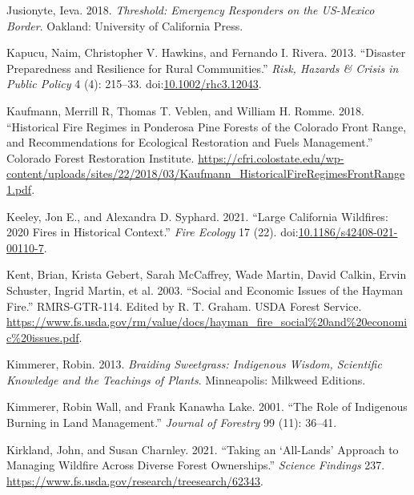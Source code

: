 \documentclass[
]{article}
\newlength{\cslhangindent}
\newenvironment{CSLReferences}[2] %
 {\begin{list}{}{%
  \setlength{\itemindent}{0pt}
  \setlength{\leftmargin}{0pt}
  \setlength{\parsep}{0pt}
  \ifodd #1
   \setlength{\leftmargin}{\cslhangindent}
   \setlength{\itemindent}{-1\cslhangindent}
  \fi
  \setlength{\itemsep}{#2\baselineskip}}}
 {\end{list}}
\begin{document}
\begin{CSLReferences}{1}{0}
Jusionyte, Ieva. 2018. \emph{Threshold: {Emergency Responders} on the {US-Mexico Border}}. Oakland: University of California Press.

Kapucu, Naim, Christopher V. Hawkins, and Fernando I. Rivera. 2013. {``Disaster {Preparedness} and {Resilience} for {Rural Communities}.''} \emph{Risk, Hazards \& Crisis in Public Policy} 4 (4): 215--33. doi:\href{https://doi.org/10.1002/rhc3.12043}{10.1002/rhc3.12043}.

Kaufmann, Merrill R, Thomas T. Veblen, and William H. Romme. 2018. {``Historical {Fire Regimes} in {Ponderosa Pine Forests} of the {Colorado Front Range}, and {Recommendations} for {Ecological Restoration} and {Fuels Management}.''} Colorado Forest Restoration Institute. \url{https://cfri.colostate.edu/wp-content/uploads/sites/22/2018/03/Kaufmann_HistoricalFireRegimesFrontRange1.pdf}.

Keeley, Jon E., and Alexandra D. Syphard. 2021. {``Large {California} Wildfires: 2020 Fires in Historical Context.''} \emph{Fire Ecology} 17 (22). doi:\href{https://doi.org/10.1186/s42408-021-00110-7}{10.1186/s42408-021-00110-7}.

Kent, Brian, Krista Gebert, Sarah McCaffrey, Wade Martin, David Calkin, Ervin Schuster, Ingrid Martin, et al. 2003. {``Social and {Economic Issues} of the {Hayman Fire}.''} RMRS-GTR-114. Edited by R. T. Graham. USDA Forest Service. \url{https://www.fs.usda.gov/rm/value/docs/hayman_fire_social\%20and\%20economic\%20issues.pdf}.

Kimmerer, Robin. 2013. \emph{Braiding {Sweetgrass}: {Indigenous Wisdom}, {Scientific Knowledge} and the {Teachings} of {Plants}}. Minneapolis: Milkweed Editions.

Kimmerer, Robin Wall, and Frank Kanawha Lake. 2001. {``The {Role} of {Indigenous Burning} in {Land Management}.''} \emph{Journal of Forestry} 99 (11): 36--41.

Kirkland, John, and Susan Charnley. 2021. {``Taking an {`All-Lands'} Approach to Managing Wildfire Across Diverse Forest Ownerships.''} \emph{Science Findings} 237. \url{https://www.fs.usda.gov/research/treesearch/62343}.


\end{CSLReferences}
\end{document}
